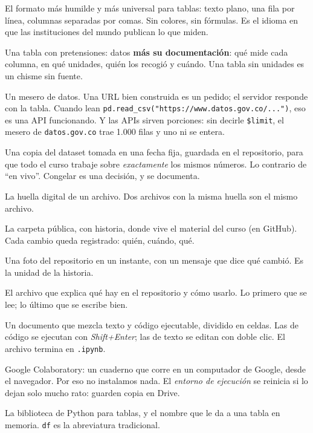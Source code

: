 \documentclass[12pt,letterpaper]{article}
\begin{document}
\begin{description}[leftmargin=1.5em,style=nextline]
    \item[CSV (\emph{comma-separated values})] El formato más humilde y más universal para tablas: texto plano, una fila por línea, columnas separadas por comas. Sin colores, sin fórmulas. Es el idioma en que las instituciones del mundo publican lo que miden.
    \item[Dataset] Una tabla con pretensiones: datos \textbf{más su documentación}: qué mide cada columna, en qué unidades, quién los recogió y cuándo. Una tabla sin unidades es un chisme sin fuente.
    \item[API (\emph{application programming interface})] Un mesero de datos. Una URL bien construida es un pedido; el servidor responde con la tabla. Cuando lean \texttt{pd.read\_csv("https://www.datos.gov.co/...")}, eso es una API funcionando. Y las APIs sirven porciones: sin decirle \texttt{\$limit}, el mesero de \texttt{datos.gov.co} trae 1.000 filas y uno ni se entera.
    \item[Dato congelado] Una copia del dataset tomada en una fecha fija, guardada en el repositorio, para que todo el curso trabaje sobre \emph{exactamente} los mismos números. Lo contrario de ``en vivo''. Congelar es una decisión, y se documenta.
    \item[Checksum / MD5] La huella digital de un archivo. Dos archivos con la misma huella son el mismo archivo.
    \item[Repositorio] La carpeta pública, con historia, donde vive el material del curso (en GitHub). Cada cambio queda registrado: quién, cuándo, qué.
    \item[Commit] Una foto del repositorio en un instante, con un mensaje que dice qué cambió. Es la unidad de la historia.
    \item[README] El archivo que explica qué hay en el repositorio y cómo usarlo. Lo primero que se lee; lo último que se escribe bien.
    \item[Cuaderno (\emph{notebook}) / celda] Un documento que mezcla texto y código ejecutable, dividido en celdas. Las de código se ejecutan con \emph{Shift+Enter}; las de texto se editan con doble clic. El archivo termina en \texttt{.ipynb}.
    \item[Colab] Google Colaboratory: un cuaderno que corre en un computador de Google, desde el navegador. Por eso no instalamos nada. El \emph{entorno de ejecución} se reinicia si lo dejan solo mucho rato: guarden copia en Drive.
    \item[pandas / DataFrame] La biblioteca de Python para tablas, y el nombre que le da a una tabla en memoria. \texttt{df} es la abreviatura tradicional.

\end{description}
\end{document}
